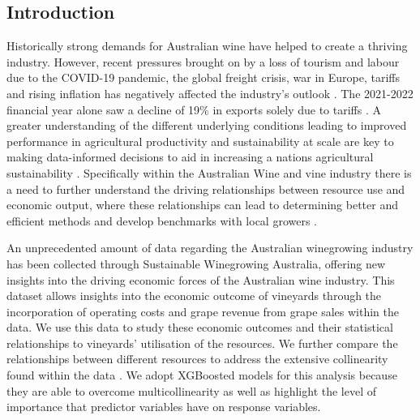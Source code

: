 \documentclass[review,12pt,authoryear]{elsarticle}
\begin{document}
\begin{linenumbers}





\section{Introduction}

Historically strong demands for Australian wine have helped to create a thriving industry. However, recent pressures brought on by a loss of tourism and labour due to the COVID-19 pandemic, the global freight crisis, war in Europe, tariffs and rising inflation has negatively affected the industry's outlook \citep{wineaustraliaNationalVintageReport2021,wineaustraliaAustralianWineProduction2021}. The 2021-2022 financial year alone saw a decline of 19\% in exports solely due to tariffs \citep{wineaustraliaNationalVintageReport2022}. A greater understanding of the different underlying conditions leading to improved performance in agricultural productivity and sustainability at scale are key to making data-informed decisions to aid in increasing a nations agricultural sustainability \citep{oecdInnovationProductivitySustainability2019}. Specifically within the Australian Wine and vine industry there is a need to further understand the driving relationships between resource use and economic output, where these relationships can lead to determining better and efficient methods and develop benchmarks with local growers \citep{lukemanciniUnderstandingAustralianWine2020}.
\par
An unprecedented amount of data regarding the Australian winegrowing industry has been collected through Sustainable Winegrowing Australia, offering new insights into the driving economic forces of the Australian wine industry. This dataset allows insights into the economic outcome of vineyards through the incorporation of operating costs and grape revenue from grape sales within the data. We use this data to study these economic outcomes and their statistical relationships to vineyards' utilisation of the resources. We further compare the relationships between different resources to address the extensive collinearity found within the data \citep{chenXGBoostScalableTree2016}. We adopt XGBoosted models for this analysis because they are able to overcome multicollinearity as well as highlight the level of importance that predictor variables have on response variables.


\end{linenumbers}
\end{document}
